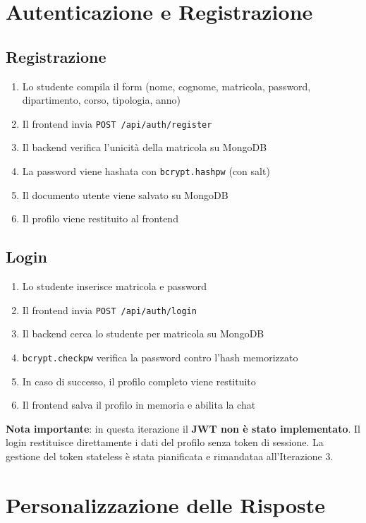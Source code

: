 \documentclass[a4paper,12pt]{report}
\begin{document}
\section{Autenticazione e Registrazione}

\subsection{Registrazione}
\begin{enumerate}
    \item Lo studente compila il form (nome, cognome, matricola, password, dipartimento, corso, tipologia, anno)
    \item Il frontend invia \texttt{POST /api/auth/register}
    \item Il backend verifica l'unicità della matricola su MongoDB
    \item La password viene hashata con \texttt{bcrypt.hashpw} (con salt)
    \item Il documento utente viene salvato su MongoDB
    \item Il profilo viene restituito al frontend
\end{enumerate}

\subsection{Login}
\begin{enumerate}
    \item Lo studente inserisce matricola e password
    \item Il frontend invia \texttt{POST /api/auth/login}
    \item Il backend cerca lo studente per matricola su MongoDB
    \item \texttt{bcrypt.checkpw} verifica la password contro l'hash memorizzato
    \item In caso di successo, il profilo completo viene restituito
    \item Il frontend salva il profilo in memoria e abilita la chat
\end{enumerate}

\textbf{Nota importante}: in questa iterazione il \textbf{JWT non è stato implementato}. Il login restituisce direttamente i dati del profilo senza token di sessione. La gestione del token stateless è stata pianificata e rimandataa all'Iterazione 3.

\section{Personalizzazione delle Risposte}
\end{document}

